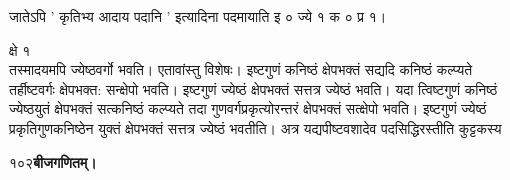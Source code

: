 \documentclass[11pt, openany]{book}
\begin{document}
\begin{sloppypar}
\hangindent=0.2in जातेऽपि ' कृतिभ्य आदाय पदानि ' इत्यादिना पदमायाति इ ० ज्ये १ क ० प्र १।

\hspace{4.55in}क्षे १\\

\hangindent=0.2in तस्मादयमपि ज्येष्ठवर्गो भवति। एतावांस्तु विशेषः। इष्टगुणं कनिष्ठं क्षेपभक्तं सद्यदि कनिष्ठं कल्प्यते तर्हीष्टवर्गः क्षेपभक्त: सन्क्षेपो भवति। इष्टगुणं ज्येष्ठं क्षेपभक्तं सत्तत्र ज्येष्ठं भवति। यदा त्विष्टगुणं कनिष्ठं ज्येष्ठयुतं क्षेपभक्तं सत्कनिष्ठं कल्प्यते तदा गुणवर्गप्रकृत्योरन्तरं क्षेपभक्तं सत्क्षेपो भवति। इष्टगुणं ज्येष्ठं प्रकृतिगुणकनिष्ठेन युक्तं क्षेपभक्तं सत्तत्र ज्येष्ठं भवतीति। अत्र यद्यपीष्टवशादेव पदसिद्धिरस्तीति कुट्टकस्य
\end{sloppypar}
\thispagestyle{empty}
\newpage

\onehalfspacing
१०२\hspace{2in}\textbf{बीजगणितम्।} 

\vspace{5mm}
\end{document}

